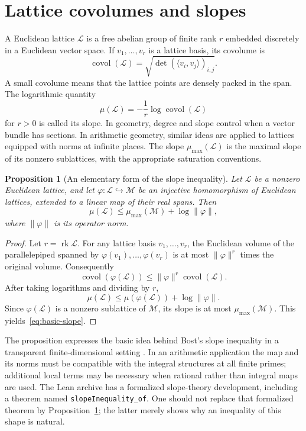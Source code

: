 \documentclass[11pt,openany,oneside]{scrbook}
\newtheorem{proposition}[theorem]{Proposition}
\theoremstyle{definition}
\theoremstyle{remark}
\begin{document}
\section{Lattice covolumes and slopes}

A Euclidean lattice $\mathcal L$ is a free abelian group of finite rank $r$ embedded discretely in a Euclidean vector space. If $v_1,\ldots,v_r$ is a lattice basis, its covolume is
\[
\operatorname{covol}(\mathcal L)
=\sqrt{\det(\langle v_i,v_j\rangle)_{i,j}}.
\]
A small covolume means that the lattice points are densely packed in the span. The logarithmic quantity
\begin{equation}\label{eq:slope}
\mu(\mathcal L)=-\frac1r\log\operatorname{covol}(\mathcal L)
\end{equation}
for $r>0$ is called its slope. In geometry, degree and slope control when a vector bundle has sections. In arithmetic geometry, similar ideas are applied to lattices equipped with norms at infinite places. The slope $\mu_{\max}(\mathcal L)$ is the maximal slope of its nonzero sublattices, with the appropriate saturation conventions.

\begin{proposition}[An elementary form of the slope inequality]\label{prop:slope}
Let $\mathcal L$ be a \emph{nonzero} Euclidean lattice, and let $\varphi:\mathcal L\hookrightarrow\mathcal M$ be an injective homomorphism of Euclidean lattices, extended to a linear map of their real spans. Then
\begin{equation}\label{eq:basic-slope}
\mu(\mathcal L)\le\mu_{\max}(\mathcal M)+\log\|\varphi\|,
\end{equation}
where $\|\varphi\|$ is its operator norm.
\end{proposition}
\begin{proof}
Let $r=\operatorname{rk}\mathcal L$. For any lattice basis $v_1,\ldots,v_r$, the Euclidean volume of the parallelepiped spanned by $\varphi(v_1),\ldots,\varphi(v_r)$ is at most $\|\varphi\|^r$ times the original volume. Consequently
\[
\operatorname{covol}(\varphi(\mathcal L))
\le\|\varphi\|^r\operatorname{covol}(\mathcal L).
\]
After taking logarithms and dividing by $r$,
\[
\mu(\mathcal L)
\le\mu(\varphi(\mathcal L))+\log\|\varphi\|.
\]
Since $\varphi(\mathcal L)$ is a nonzero sublattice of $\mathcal M$, its slope is at most $\mu_{\max}(\mathcal M)$. This yields~\eqref{eq:basic-slope}.
\end{proof}

The proposition expresses the basic idea behind Bost's slope inequality in a transparent finite-dimensional setting \parencite{Bost2001}. In an arithmetic application the map and its norms must be compatible with the integral structures at all finite primes; additional local terms may be necessary when rational rather than integral maps are used. The Lean archive has a formalized slope-theory development, including a theorem named \texttt{slopeInequality\_of}. One should not replace that formalized theorem by Proposition~\ref{prop:slope}; the latter merely shows why an inequality of this shape is natural.
\end{document}
